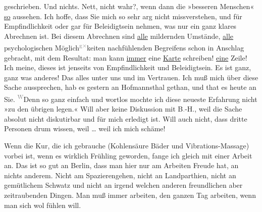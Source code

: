                geschrieben. Und nichts. Nett, nicht wahr?, wenn dann die »besseren Menschen« \uline{so} aussehen. Ich hoffe, dass Sie mich so sehr arg
               nicht missverstehen, und für Empfindlichkeit oder gar für Beleidigtsein nehmen, was
               nur ein ganz klares Abrechnen ist. Bei diesem Abrechnen sind \uline{alle} mildernden Umstände, \uline{alle}
               psychologischen Möglich\substVorne{}\textsuperscript{\textcolor{gray}{g}\textcolor{gray}{×}}\substDazwischen{}k\substHinten{}eiten nachfühlenden Begreifens schon in Anschlag gebracht, mit dem Resultat:
               man kann \uline{immer} eine \uline{Karte} schreiben! \uline{eine} Zeile! Ich meine,
               dieses ist jenseits von Empfindlichkeit und Beleidigtsein. Es ist ganz, ganz was
               anderes! Das alles unter uns und im Vertrauen. Ich muß mich über diese Sache
               aussprechen, hab es gestern an Hofmannsthal gethan, und that es heute an Sie. \substVorne{}\textsuperscript{\textcolor{gray}{W}}\substDazwischen{}De\substHinten{}nn so ganz einfach und wortlos mochte ich diese neueste Erfahrung nicht »zu
               den übrigen legen.« Will aber keine Diskussion mit B\textcolor{gray}{.}-H., weil die Sache absolut nicht diskutirbar und
               für mich erledigt ist. Will auch nicht, dass dritte Personen drum wissen, weil {\dots} weil ich mich schäme!\pend
           
\pstart
           Wenn die Kur, die ich gebrauche (Kohlensäure Bäder und Vibrations-Massage) vorbei
               ist, wenn es wirklich Frühling geworden, fange ich gleich mit einer Arbeit an. Das
               ist so gut an Berlin, dass man hier nur am
               Arbeiten Freude hat, an nichts anderem. Nicht am Spazierengehen, nicht an
               Landparthien, nicht an gemütlichem Schwatz und nicht an irgend welchen anderen
               freundlichen aber zeitraubenden Dingen. Man muß immer arbeiten, den ganzen Tag
               arbeiten, wenn man sich wol fühlen will.\pend
           
